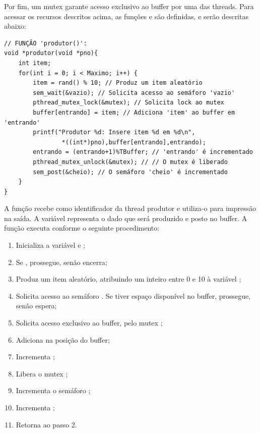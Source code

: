 \documentclass[
	12pt,				%
	openright,			%
	oneside,			%
	a4paper,			%
	chapter=TITLE,		%
	english,			%
	french,				%
	spanish,			%
	brazil				%
	]{abntex2}
\theoremstyle{definition}
\begin{document}
Por fim, um mutex  garante acesso exclusivo ao buffer por uma das threads. Para acessar os recursos descritos acima, as funções  e  são definidas, e serão descritas abaixo:

\begin{verbatim}
// FUNÇÃO 'produtor()':
void *produtor(void *pno){
    int item;
    for(int i = 0; i < Maximo; i++) {
        item = rand() % 10; // Produz um item aleatório
        sem_wait(&vazio); // Solicita acesso ao semáforo 'vazio'
        pthread_mutex_lock(&mutex); // Solicita lock ao mutex 
        buffer[entrando] = item; // Adiciona 'item' ao buffer em 'entrando'
        printf("Produtor %d: Insere item %d em %d\n", 
                *((int*)pno),buffer[entrando],entrando);
        entrando = (entrando+1)%TBuffer; // 'entrando' é incrementado 
        pthread_mutex_unlock(&mutex); // // O mutex é liberado
        sem_post(&cheio); // O semáforo 'cheio' é incrementado
    }
}
\end{verbatim}

A função  recebe  como identificador da thread produtor e utiliza-o para impressão na saída. A variável  representa o dado que será produzido e posto no buffer. A função executa conforme o seguinte procedimento:

\begin{enumerate}
    \item Inicializa a variável  e ;
    \item Se , prossegue, senão encerra;
    \item Produz um item aleatório, atribuindo um inteiro entre 0 e 10 à variável ;
    \item Solicita acesso ao semáforo . Se tiver espaço disponível no buffer, prossegue, senão espera;
    \item Solicita acesso exclusivo ao buffer, pelo mutex ;
    \item Adiciona  na posição  do buffer;
    \item Incrementa ;
    \item Libera o mutex ;
    \item Incrementa o semáforo ;
    \item Incrementa ;
    \item Retorna ao passo 2.
\end{enumerate}
\end{document}
